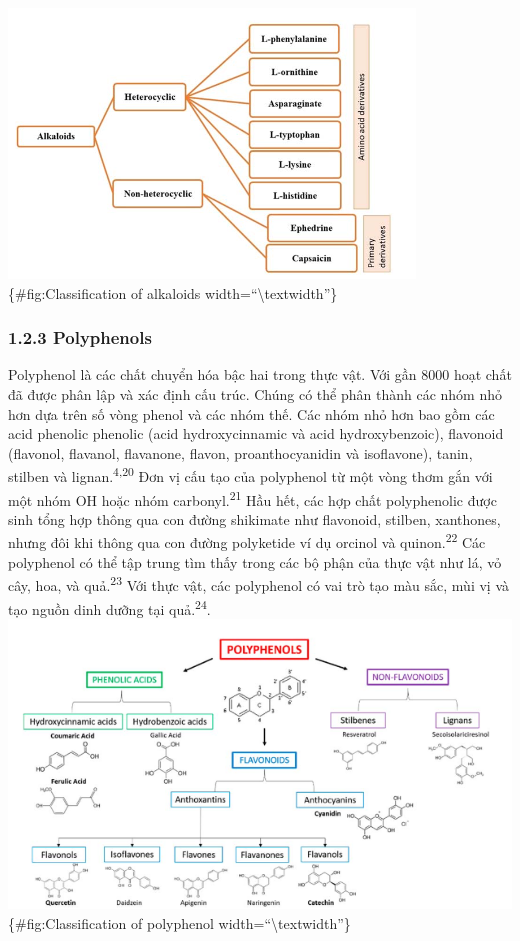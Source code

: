 \documentclass[
  letterpaper,
  DIV=11,
  numbers=noendperiod]{scrartcl}
\begin{document}
\includegraphics{../graphics/Classification of alkaloids.png}\{\#fig:Classification
of alkaloids width=``\textbackslash textwidth''\}

\subsubsection{1.2.3 Polyphenols}\label{polyphenols}

Polyphenol là các chất chuyển hóa bậc hai trong thực vật. Với gần 8000
hoạt chất đã được phân lập và xác định cấu trúc. Chúng có thể phân thành
các nhóm nhỏ hơn dựa trên số vòng phenol và các nhóm thế. Các nhóm nhỏ
hơn bao gồm các acid phenolic phenolic (acid hydroxycinnamic và acid
hydroxybenzoic), flavonoid (flavonol, flavanol, flavanone, flavon,
proanthocyanidin và isoflavone), tanin, stilben và
lignan.\textsuperscript{4,20} Đơn vị cấu tạo của polyphenol từ một vòng
thơm gắn với một nhóm OH hoặc nhóm carbonyl.\textsuperscript{21} Hầu
hết, các hợp chất polyphenolic được sinh tổng hợp thông qua con đường
shikimate như flavonoid, stilben, xanthones, nhưng đôi khi thông qua con
đường polyketide ví dụ orcinol và quinon.\textsuperscript{22} Các
polyphenol có thể tập trung tìm thấy trong các bộ phận của thực vật như
lá, vỏ cây, hoa, và quả.\textsuperscript{23} Với thực vật, các
polyphenol có vai trò tạo màu sắc, mùi vị và tạo nguồn dinh dưỡng tại
quả.\textsuperscript{24}.\\

\includegraphics{../graphics/Classification of polyphenols.png}\{\#fig:Classification
of polyphenol width=``\textbackslash textwidth''\}
\end{document}
